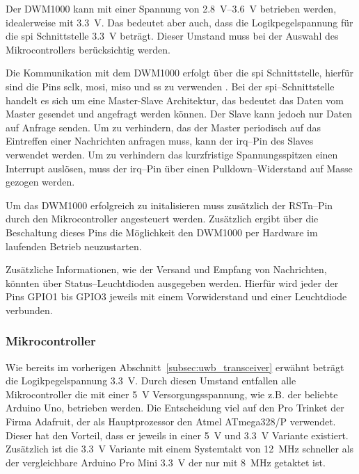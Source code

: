 Der DWM1000 kann mit einer Spannung von \SIrange{2.8}{3.6}{\volt}\cite{decawave2016dwm1kdatasheet} betrieben werden, idealerweise mit \SI{3.3}{\volt}. Das bedeutet aber auch, dass die Logikpegelspannung für die \gls{spi} Schnittstelle \SI{3.3}{\volt} beträgt. Dieser Umstand muss bei der Auswahl des Mikrocontrollers berücksichtig werden.

Die Kommunikation mit dem DWM1000 erfolgt über die \gls{spi} Schnittstelle, hierfür sind die Pins \gls{sclk}, \gls{mosi}, \gls{miso} und \gls{ss} zu verwenden \cite{decawave2016dwm1kdatasheet}. Bei der \gls{spi}--Schnittstelle handelt es sich um eine Master-Slave Architektur, das bedeutet das Daten vom Master gesendet und angefragt werden können. Der Slave kann jedoch nur Daten auf Anfrage senden. Um zu verhindern, das der Master periodisch auf das Eintreffen einer Nachrichten anfragen muss, kann der \gls{irq}--Pin des Slaves verwendet werden. Um zu verhindern das kurzfristige Spannungsspitzen einen Interrupt auslösen, muss der \gls{irq}--Pin über einen Pulldown--Widerstand auf Masse gezogen werden.

Um das DWM1000 erfolgreich zu initalisieren muss zusätzlich der RSTn--Pin durch den Mikrocontroller angesteuert werden. Zusätzlich ergibt über die Beschaltung dieses Pins die Möglichkeit den DWM1000 per Hardware im laufenden Betrieb neuzustarten.

Zusätzliche Informationen, wie der Versand und Empfang von Nachrichten, könnten über Status--Leuchtdioden ausgegeben werden. Hierfür wird jeder der Pins GPIO1 bis GPIO3 jeweils mit einem Vorwiderstand und einer Leuchtdiode verbunden.


\begin{comment}
------------------------------------------------------------------------------------------
\end{comment}
\subsubsection{Mikrocontroller}

Wie bereits im vorherigen Abschnitt~\ref{subsec:uwb_transceiver} erwähnt beträgt die Logikpegelspannung \SI{3.3}{\volt}. Durch diesen Umstand entfallen alle Mikrocontroller die mit einer \SI{5}{\volt} Versorgungsspannung, wie z.B. der beliebte Arduino Uno, betrieben werden. Die Entscheidung viel auf den Pro Trinket der Firma Adafruit, der als Hauptprozessor den Atmel ATmega328/P verwendet. Dieser hat den Vorteil, dass er jeweils in einer \SI{5}{\volt} und \SI{3.3}{\volt} Variante existiert. Zusätzlich ist die \SI{3.3}{\volt} Variante mit einem Systemtakt von \SI{12}{\MHz} schneller als der vergleichbare Arduino Pro Mini \SI{3.3}{\volt} der nur mit \SI{8}{\MHz} getaktet ist.

